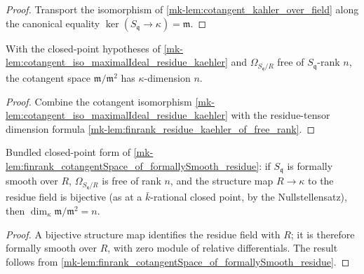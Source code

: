 \begin{proof}
  Transport the isomorphism of
  \ref{mk-lem:cotangent_kahler_over_field} along the canonical equality
  \(\ker(S_{\mathfrak q} \to \kappa) = \mathfrak m\).
\end{proof}

\begin{lemma}\label{mk-lem:finrank_cotangentSpace_of_formallySmooth_residue}
  \leanok

  With the closed-point hypotheses of
  \ref{mk-lem:cotangent_iso_maximalIdeal_residue_kaehler} and
  \(\Omega_{S_{\mathfrak q}/R}\) free of \(S_{\mathfrak q}\)-rank \(n\), the cotangent
  space \(\mathfrak m / \mathfrak m^2\) has \(\kappa\)-dimension \(n\).
\end{lemma}

\begin{proof}
  Combine the cotangent isomorphism
  \ref{mk-lem:cotangent_iso_maximalIdeal_residue_kaehler} with the residue-tensor
  dimension formula \ref{mk-lem:finrank_residue_kaehler_of_free_rank}.
\end{proof}

\begin{lemma}\label{mk-lem:finrank_cotangentSpace_of_bijective_residue}
  \leanok

  Bundled closed-point form of
  \ref{mk-lem:finrank_cotangentSpace_of_formallySmooth_residue}: if \(S_{\mathfrak q}\)
  is formally smooth over \(R\), \(\Omega_{S_{\mathfrak q}/R}\) is free of rank \(n\),
  and the structure map \(R \to \kappa\) to the residue field is bijective (as at a
  \(\bar k\)-rational closed point, by the Nullstellensatz), then
  \(\dim_\kappa \mathfrak m/\mathfrak m^2 = n\).
\end{lemma}

\begin{proof}
  A bijective structure map identifies the residue field with \(R\); it is
  therefore formally smooth over \(R\), with zero module of relative
  differentials.  The result follows from
  \ref{mk-lem:finrank_cotangentSpace_of_formallySmooth_residue}.
\end{proof}

